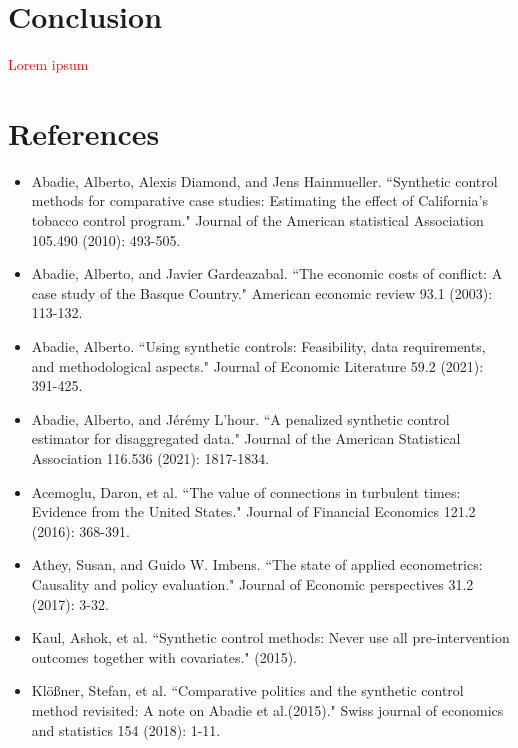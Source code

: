 \documentclass[12pt,a4paper,draft]{article}
\begin{document}
\section{Conclusion}
\textcolor{red}{Lorem ipsum}


\newpage
\section{References}
\begin{itemize}
    \item Abadie, Alberto, Alexis Diamond, and Jens Hainmueller. ``Synthetic control methods for comparative case studies: Estimating the effect of California's tobacco control program." Journal of the American statistical Association 105.490 (2010): 493-505.
    \item Abadie, Alberto, and Javier Gardeazabal. ``The economic costs of conflict: A case study of the Basque Country." American economic review 93.1 (2003): 113-132.
    \item Abadie, Alberto. ``Using synthetic controls: Feasibility, data requirements, and methodological aspects." Journal of Economic Literature 59.2 (2021): 391-425.
    \item Abadie, Alberto, and Jérémy L'hour. ``A penalized synthetic control estimator for disaggregated data." Journal of the American Statistical Association 116.536 (2021): 1817-1834.
    \item Acemoglu, Daron, et al. ``The value of connections in turbulent times: Evidence from the United States." Journal of Financial Economics 121.2 (2016): 368-391.
    \item Athey, Susan, and Guido W. Imbens. ``The state of applied econometrics: Causality and policy evaluation." Journal of Economic perspectives 31.2 (2017): 3-32.
    \item Kaul, Ashok, et al. ``Synthetic control methods: Never use all pre-intervention outcomes together with covariates." (2015).
    \item Klößner, Stefan, et al. ``Comparative politics and the synthetic control method revisited: A note on Abadie et al.(2015)." Swiss journal of economics and statistics 154 (2018): 1-11.
\end{itemize}
\end{document}
